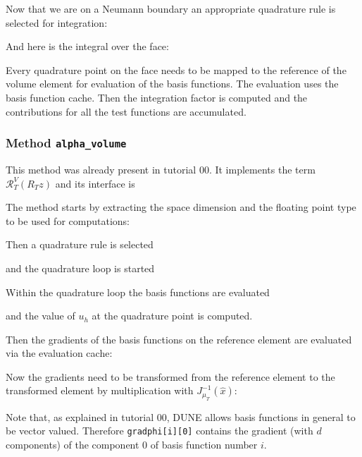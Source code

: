 \documentclass[a4paper,12pt]{article}
\begin{document}
Now that we are on a Neumann boundary an appropriate quadrature rule
is selected for integration:


And here is the integral over the face:

Every quadrature point on the face needs to be mapped to the reference
of the volume element for evaluation of the basis functions.
The evaluation uses the basis function cache. Then the integration
factor is computed and the contributions for all the test functions
are accumulated.

\subsubsection*{Method \lstinline{alpha_volume}}

This method was already present in tutorial 00. 
It implements the term $\mathcal{R}_T^V(R_T z)$ and its interface is


The method starts by extracting the space dimension and
the floating point type to be used for computations:


Then a quadrature rule is selected

and the quadrature loop is started


Within the quadrature loop the basis functions are evaluated

and the value of $u_h$ at the quadrature point is computed.

Then the gradients of the basis functions on the reference element are evaluated
via the evaluation cache:

Now the gradients need to be transformed from the reference element
to the transformed element by multiplication with $J_{\mu_T}^{-1}(\hat x)$:

Note that, as explained in tutorial 00, DUNE allows basis functions
in general to be vector valued. Therefore \lstinline{gradphi[i][0]} contains
the gradient (with $d$ components) of the component 0 of basis function number $i$.
\end{document}
